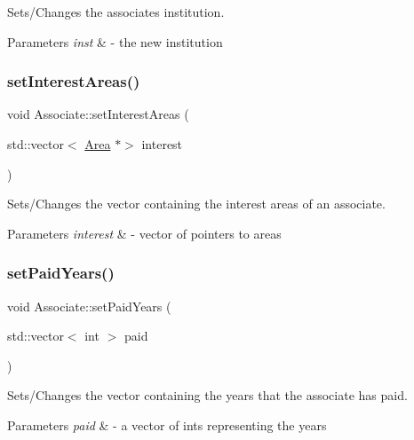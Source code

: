 Sets/\+Changes the associate\textquotesingle{}s institution. 


\begin{DoxyParams}{Parameters}
{\em inst} & -\/ the new institution \\
\hline
\end{DoxyParams}
\mbox{\label{classAssociate_a5b416da0898fd5dda854eb0027e9e8a1}} 
\subsubsection{\texorpdfstring{set\+Interest\+Areas()}{setInterestAreas()}}
{\footnotesize\ttfamily void Associate\+::set\+Interest\+Areas (\begin{DoxyParamCaption}\item[{std\+::vector$<$ \mbox{\hyperlink{classArea}{Area}} $\ast$$>$}]{interest }\end{DoxyParamCaption})}



Sets/\+Changes the vector containing the interest areas of an associate. 


\begin{DoxyParams}{Parameters}
{\em interest} & -\/ vector of pointers to areas \\
\hline
\end{DoxyParams}
\mbox{\label{classAssociate_a474ef6683f939d3ccec7bbbf1bd03f96}} 
\subsubsection{\texorpdfstring{set\+Paid\+Years()}{setPaidYears()}}
{\footnotesize\ttfamily void Associate\+::set\+Paid\+Years (\begin{DoxyParamCaption}\item[{std\+::vector$<$ int $>$}]{paid }\end{DoxyParamCaption})}



Sets/\+Changes the vector containing the years that the associate has paid. 


\begin{DoxyParams}{Parameters}
{\em paid} & -\/ a vector of ints representing the years \\
\hline
\end{DoxyParams}
\mbox{\label{classAssociate_a575f0c9367cb22a88737952430fe6a48}} 
